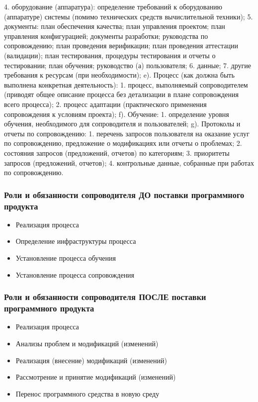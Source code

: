 \documentclass{../industrial-development}
\begin{document}
      4. оборудование (аппаратура):
        определение требований к оборудованию (аппаратуре) системы (помимо технических средств вычислительной техники);
      5. документы:
        план обеспечения качества;
        план управления проектом;
        план управления конфигурацией;
        документы разработки;
        руководства по сопровождению;
        план проведения верификации;
        план проведения аттестации (валидации);
        план тестирования, процедуры тестирования и отчеты о тестировании;
        план обучения;
        руководство (а) пользователя;
      6. данные;
      7. другие требования к ресурсам (при необходимости);
e). Процесс (как должна быть выполнена конкретная деятельность):
      1. процесс, выполняемый сопроводителем (приводят общее описание процесса без детализации в плане сопровождения всего процесса);
      2. процесс адаптации (практического применения сопровождения к условиям проекта);
f). Обучение:
      1. определение уровня обучения, необходимого для сопроводителя и пользователей;
g). Протоколы и отчеты по сопровождению:
      1. перечень запросов пользователя на оказание услуг по сопровождению, предложение о модификациях или отчеты о проблемах;
      2. состояния запросов (предложений, отчетов) по категориям;
      3. приоритеты запросов (предложений, отчетов);
      4. контрольные данные, собранные при работах по сопровождению.


\begin{frame} \frametitle{Роли и обязанности сопроводителя ДО поставки программного продукта}
	\begin{itemize}
	\item Реализация процесса 
	\item Определение инфраструктуры процесса 
	\item Установление процесса обучения 
	\item Установление процесса сопровождения 
	\end{itemize}
\end{frame}

\lecturenotes

\begin{frame} \frametitle{Роли и обязанности сопроводителя ПОСЛЕ поставки программного продукта}
	\begin{itemize}
		\item Реализация процесса
		\item Анализы проблем и модификаций (изменений)  
		\item Реализация (внесение) модификаций (изменений) 
		\item Рассмотрение и принятие модификаций (изменений) 
		\item Перенос программного средства в новую среду
	\end{itemize}
\end{frame}
\end{document}
